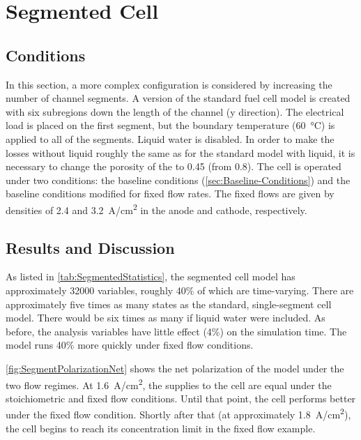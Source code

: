 \FloatBarrier %
\section{Segmented Cell}
\label{sec:SegCell}

\subsection{Conditions}

In this section, a more complex configuration is considered by increasing the number of channel segments.  A version of the standard fuel cell model is created with six subregions down the length of the channel (y direction).  The electrical load is placed on the first segment, but the boundary temperature (\SI{60}{\celsius}) is applied to all of the segments.  Liquid water is disabled.  In order to make the losses without liquid roughly the same as for the standard model with liquid, it is necessary to change the porosity of the  to 0.45 (from 0.8).  The cell is operated under two conditions: the baseline conditions (\autoref{sec:Baseline-Conditions}) and the baseline conditions modified for fixed flow rates.  The fixed flows are given by  densities of 2.4 and \SI{3.2}{A/cm^2} in the anode and cathode, respectively.

\subsection{Results and Discussion}



As listed in \autoref{tab:SegmentedStatistics}, the segmented cell model has approximately \num{32000} variables, roughly 40\% of which are time-varying.  There are approximately five times as many states as the standard, single-segment cell model.  There would be six times as many if liquid water were included.  As before, the analysis variables have little effect (4\%) on the simulation time.  The model runs 40\% more quickly under fixed flow conditions.

\autoref{fig:SegmentPolarizationNet} shows the net polarization of the model under the two flow regimes.  At \SI{1.6}{A/cm^2}, the supplies to the cell are equal under the stoichiometric and fixed flow conditions.  Until that point, the cell performs better under the fixed flow condition.  Shortly after that (at approximately \SI{1.8}{A/cm^2}), the cell begins to reach its concentration limit in the fixed flow example.

